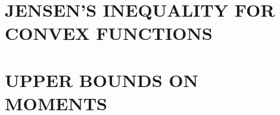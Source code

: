 \documentclass[12pt]{report}
\begin{document}
\begin{acknowledgements}

     

\end{acknowledgements}
\begin{abstract}
	

	\indent
\end{abstract}
\tableofcontents
\listoffigures
\listoftables
{}%
\appendix
\chapter{JENSEN'S INEQUALITY FOR CONVEX FUNCTIONS}
\chapter{UPPER BOUNDS ON MOMENTS}

%
%
%


\thebiography

\end{document}
